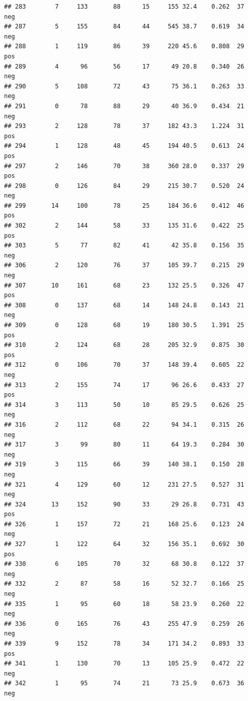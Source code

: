 \documentclass[
]{article}
\begin{document}
\begin{verbatim}
## 283        7     133       88      15     155 32.4    0.262  37      neg
## 287        5     155       84      44     545 38.7    0.619  34      neg
## 288        1     119       86      39     220 45.6    0.808  29      pos
## 289        4      96       56      17      49 20.8    0.340  26      neg
## 290        5     108       72      43      75 36.1    0.263  33      neg
## 291        0      78       88      29      40 36.9    0.434  21      neg
## 293        2     128       78      37     182 43.3    1.224  31      pos
## 294        1     128       48      45     194 40.5    0.613  24      pos
## 297        2     146       70      38     360 28.0    0.337  29      pos
## 298        0     126       84      29     215 30.7    0.520  24      neg
## 299       14     100       78      25     184 36.6    0.412  46      pos
## 302        2     144       58      33     135 31.6    0.422  25      pos
## 303        5      77       82      41      42 35.8    0.156  35      neg
## 306        2     120       76      37     105 39.7    0.215  29      neg
## 307       10     161       68      23     132 25.5    0.326  47      pos
## 308        0     137       68      14     148 24.8    0.143  21      neg
## 309        0     128       68      19     180 30.5    1.391  25      pos
## 310        2     124       68      28     205 32.9    0.875  30      pos
## 312        0     106       70      37     148 39.4    0.605  22      neg
## 313        2     155       74      17      96 26.6    0.433  27      pos
## 314        3     113       50      10      85 29.5    0.626  25      neg
## 316        2     112       68      22      94 34.1    0.315  26      neg
## 317        3      99       80      11      64 19.3    0.284  30      neg
## 319        3     115       66      39     140 38.1    0.150  28      neg
## 321        4     129       60      12     231 27.5    0.527  31      neg
## 324       13     152       90      33      29 26.8    0.731  43      pos
## 326        1     157       72      21     168 25.6    0.123  24      neg
## 327        1     122       64      32     156 35.1    0.692  30      pos
## 330        6     105       70      32      68 30.8    0.122  37      neg
## 332        2      87       58      16      52 32.7    0.166  25      neg
## 335        1      95       60      18      58 23.9    0.260  22      neg
## 336        0     165       76      43     255 47.9    0.259  26      neg
## 339        9     152       78      34     171 34.2    0.893  33      pos
## 341        1     130       70      13     105 25.9    0.472  22      neg
## 342        1      95       74      21      73 25.9    0.673  36      neg

\end{verbatim}
\end{document}
